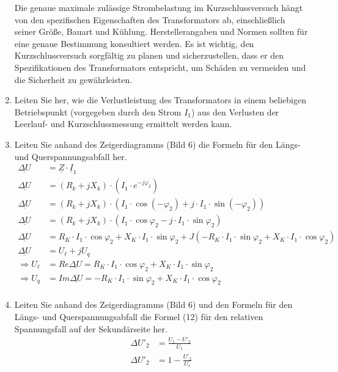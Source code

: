 \begin{enumerate}[label=\alph*)]
  Die genaue maximale zulässige Strombelastung im Kurzschlussversuch hängt von den spezifischen Eigenschaften des Transformators ab, einschließlich seiner Größe, Bauart und Kühlung. Herstellerangaben und Normen sollten für eine genaue Bestimmung konsultiert werden. Es ist wichtig, den Kurzschlussversuch sorgfältig zu planen und sicherzustellen, dass er den Spezifikationen des Transformators entspricht, um Schäden zu vermeiden und die Sicherheit zu gewährleisten.
  
  \item Leiten Sie her, wie die Verlustleistung des Transformators in einem beliebigen Betriebspunkt (vorgegeben durch den Strom $I_1$) aus den Verlusten der Leerlauf- und Kurzschlussmessung ermittelt werden kann.  
  \item Leiten Sie anhand des Zeigerdiagramms (Bild 6) die Formeln für den Längs- und Querspannungsabfall her.  
    \begin{align*}
      \underline{\Delta U}&= \underline Z\cdot \underline I_1\\
      \underline{\Delta U}&= (R_k+ jX_k)\cdot (I_1\cdot e^{-j\varphi_2})\\
      \underline{\Delta U}&= (R_k+ jX_k)\cdot \left(I_1\cdot\cos(-\varphi_2)+j\cdot I_1\cdot \sin(-\varphi_2)\right)\\
      \underline{\Delta U}&= (R_k+ jX_k)\cdot \left(I_1\cdot\cos\varphi_2-j\cdot I_1\cdot \sin\varphi_2\right)\\
      \underline{\Delta U}&= R_K\cdot I_1\cdot \cos\varphi_2 + X_K\cdot I_1 \cdot \sin\varphi_2+J(-R_K\cdot I_1 \cdot \sin\varphi_2+X_K\cdot I_1\cdot \cos\varphi_2)\\
      \underline{\Delta U}&= U_\ell +jU_q\\
      \Rightarrow U_\ell &=Re{\underline{\Delta U}}=R_K\cdot I_1 \cdot\cos \varphi_2 + X_K \cdot I_1\cdot \sin \varphi_2\\ 
      \Rightarrow U_q &=Im{\underline{\Delta U}}= -R_K\cdot I_1 \cdot\sin \varphi_2 + X_K \cdot I_1\cdot \cos \varphi_2\\ 
    \end{align*}
  \item Leiten Sie anhand des Zeigerdiagramms (Bild 6) und den Formeln für den Längs- und Querspannungsabfall die Formel (12) für den relativen Spannungsfall auf der Sekundärseite her. 
    \begin{align*}
      \Delta U'_2 &= \frac{U_1 - U'_2}{U_1}\\ 
      \Delta U'_2 &= 1-\frac{U'_2}{U_1}\\ 

\end{align*}
\end{enumerate}

